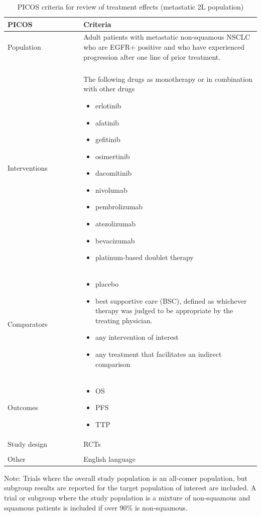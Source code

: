 \documentclass[11pt,final,fleqn]{article}\usepackage[]{graphicx}\usepackage[]{color}
\theoremstyle{plain}
\begin{document}
{\begin{appendices}
\begin{table}[!ht]
\begin{center}
\begin{threeparttable}
\caption{PICOS criteria for review of treatment effects (metastatic 2L population)} \label{tbl:picos-tx-effects-2L}
\begin{tabular}{p{0.3\linewidth}p{0.7\linewidth}}
\hline
\multicolumn{1}{l}{PICOS} &  \multicolumn{1}{l}{Criteria}\\
\hline
Population & Adult patients with metastatic non-squamous NSCLC who are EGFR+ positive and
who have experienced progression after one line of prior treatment.\\
&\\
Interventions & The following drugs as monotherapy or in combination with other drugs 
\begin{itemize}
\item erlotinib
\item afatinib
\item gefitinib
\item osimertinib
\item dacomitinib
\item nivolumab
\item pembrolizumab
\item atezolizumab
\item bevacizumab
\item platinum-based doublet therapy
\end{itemize} \\
Comparators & 
\begin{itemize}
\item placebo
\item best supportive care (BSC), defined as whichever therapy was judged to be appropriate by the treating physician.
\item any intervention of interest
\item any treatment that facilitates an indirect comparison
\end{itemize} \\
Outcomes & 
\begin{itemize}
\item OS
\item PFS
\item TTP
\end{itemize} \\
Study design & RCTs \\
&\\
Other & English language\\
\hline
\end{tabular}
\scriptsize Note: Trials where the overall study population is an all-comer population, but subgroup results are reported for the target population of interest are included. A trial or subgroup where the study population is a mixture of non-squamous and squamous patients is included if over 90\% is non-squamous.  
\end{threeparttable}
\end{center}
\end{table}


\end{appendices}}
\end{document}
